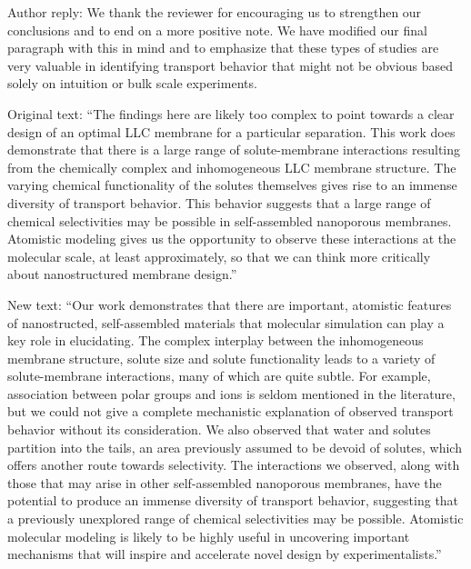 \documentclass{article}
\begin{document}
\begin{enumerate}
    Author reply: We thank the reviewer for encouraging us to strengthen our conclusions and
    to end on a more positive note. We have modified our final paragraph with this in mind 
    and to emphasize that these types of studies are very valuable in identifying transport
    behavior that might not be obvious based solely on intuition or bulk scale experiments.
    
    Original text: ``The findings here are likely too complex to point towards a clear 
    design of an optimal LLC membrane for a particular separation. This work does demonstrate
    that there is a large range of solute-membrane interactions resulting from the
    chemically complex and inhomogeneous LLC membrane structure. The varying chemical 
    functionality of the solutes themselves gives rise to an immense diversity of transport 
    behavior. This behavior suggests that a large range of chemical selectivities may be 
    possible in self-assembled nanoporous membranes. Atomistic modeling gives us the 
    opportunity to observe these interactions at the molecular scale, at least approximately,
    so that we can think more critically about nanostructured membrane design.''
    
    New text: ``Our work demonstrates that there are important, atomistic features of nanostructed, 
    self-assembled materials that molecular simulation can play a key role in elucidating.
    The complex interplay between the inhomogeneous membrane structure, solute size and 
    solute functionality leads to a variety of solute-membrane interactions, many of which
    are quite subtle. For example, association between polar groups and ions is seldom 
    mentioned in the literature, but we could not give a complete mechanistic explanation
    of observed transport behavior without its consideration. We also observed that water
    and solutes partition into the tails, an area previously assumed to be devoid of solutes,
    which offers another route towards selectivity.
    The interactions we observed, along with those that may arise in other self-assembled
    nanoporous membranes, have the potential to produce an immense diversity of transport
    behavior, suggesting that a previously unexplored range of chemical selectivities may
    be possible. Atomistic molecular modeling is likely to be highly useful in uncovering 
    important mechanisms that will inspire and accelerate novel design by experimentalists.''
	
\end{enumerate}
\end{document}
